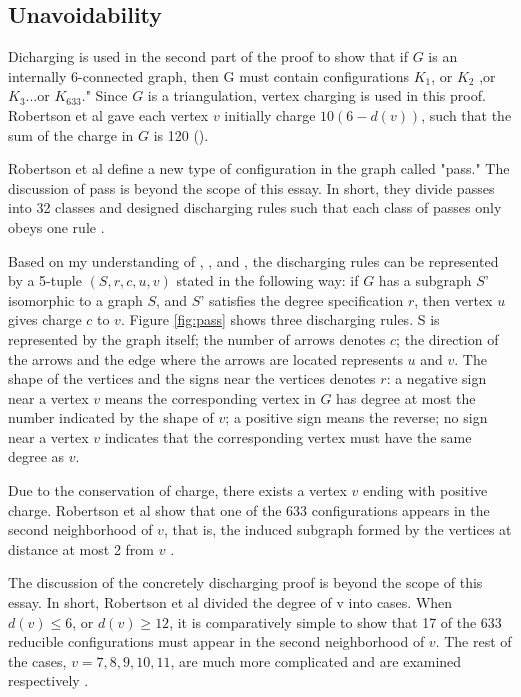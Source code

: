 \documentclass[a4paper, 11pt]{article} %
\begin{document}
\subsection{Unavoidability}
Dicharging is used in the second part of the proof to show that if $G$ is an internally 6-connected graph, then G must contain configurations $K_{1}$, or $ K_{2}$ ,or $K_{3}$...or $K_{633}$."
Since $G$ is a triangulation, vertex charging is used in this proof. Robertson et al gave each vertex $v$ initially charge $10(6 - d(v))$, such that the sum of the charge in $G$ is 120 (\cite{thomas1998update}). 

Robertson et al define a new type of configuration in the graph called "pass." The discussion of pass is beyond the scope of this essay. In short, they divide passes into 32 classes and designed discharging rules such that each class of passes only obeys one rule \cite{chesler2006four}.

Based on my understanding of  \cite{chesler2006four}, \cite{robertson1997four}, and \cite{thomas1998update}, the discharging rules can be represented by a 5-tuple $(S, r, c, u,v)$ stated in the following way: if $G$ has a subgraph $S$' isomorphic to a graph $S$, and $S$' satisfies the degree specification $r$, then vertex $u$ gives charge $c$ to $v$. Figure \ref{fig:pass} shows three discharging rules. S is represented by the graph itself; the number of arrows denotes $c$; the direction of the arrows and the edge where the arrows are located represents $u$ and $v$. The shape of the vertices and the signs near the vertices denotes $r$: a negative sign near a vertex $v$ means the corresponding vertex in $G$ has degree at most the number indicated by the shape of $v$; a positive sign means the reverse; no sign near a vertex $v$ indicates that the corresponding vertex must have the same degree as $v$. 

Due to the conservation of charge, there exists a vertex $v$ ending with positive charge. Robertson et al show that one of the 633 configurations appears in the second neighborhood of $v$, that is, the induced subgraph formed by the vertices at distance at most 2 from $v$ \cite{thomas1998update}. 

The discussion of the concretely discharging proof is beyond the scope of this essay. In short, Robertson et al divided the degree of v into cases. When $d(v) \leq 6$, or $d(v) \geq 12$, it is comparatively simple to show that 17 of the 633 reducible configurations must appear in the second neighborhood of $v$. The rest of the cases, $v = 7,8,9,10,11$, are much more complicated and are examined respectively \cite{thomas1998update}. 
\end{document}
